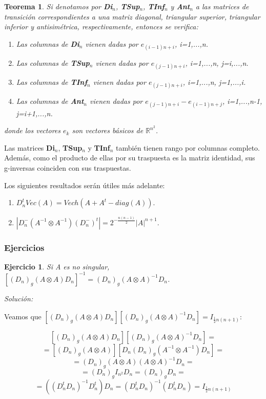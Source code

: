 \documentclass{article}
\theoremstyle{theorem-style}  %
\newtheorem{theorem}{Teorema}[section]  %
\theoremstyle{definition-style}
\theoremstyle{example-style}
\theoremstyle{exercise-style}
\newtheorem{exercise}{Ejercicio}[section]
\begin{document}
	\begin{theorem}
		Si denotamos por \textbf{Di$_n$}, \textbf{TSup$_n$}, \textbf{TInf$_n$} y \textbf{Ant$_n$} a las matrices de transición correspondientes a una matriz diagonal, triangular superior, triangular inferior y antisimétrica, respectivamente, entonces se verifica:
		\begin{enumerate}
			\item Las columnas de \textbf{Di$_n$} vienen dadas por $e_{(i-1)n+i}$, i=1,...,n.
			\item Las columnas de \textbf{TSup$_n$} vienen dadas por $e_{(j-1)n+i}$, i=1,...,n, j=i,...,n.
			\item Las columnas de \textbf{TInf$_n$} vienen dadas por $e_{(j-1)n+i}$, i=1,...,n, j=1,...,i.
			\item Las columnas de \textbf{Ant$_n$} vienen dadas por $e_{(j-1)n+i}-e_{(i-1)n+j}$, i=1,...,n-1, j=i+1,...,n.
		\end{enumerate}
		donde los vectores $e_k$ son vectores básicos de $\mathbb{R}^{n^2}$.
	\end{theorem}
	
	Las matrices \textbf{Di$_n$}, \textbf{TSup$_n$} y \textbf{TInf$_n$} también tienen rango por columnas completo. Además, como el producto de ellas por su traspuesta es la matriz identidad, sus g-inversas coinciden con sus traspuestas.
	
	Los siguientes resultados serán útiles más adelante:
	\begin{enumerate}
		\item $D_n^tVec(A) = Vech(A+A^t-diag(A))$.
		\item $|D_n^-(A^{-1}\otimes A^{-1})(D_n^-)^t| = 2^{-\frac{n(n-1)}{2}}|A|^{n+1}$.
	\end{enumerate}
	
	
	
	\subsubsection{Ejercicios}
	\begin{exercise}
		Si A es no singular, $[(D_n)_g(A\otimes A)D_n]^{-1} = (D_n)_g(A\otimes A)^{-1}D_n$.
	\end{exercise}
	
	\textit{Solución:}
	
	Veamos que $[(D_n)_g(A\otimes A)D_n][(D_n)_g(A\otimes A)^{-1}D_n] = I_{\frac{1}{2}n(n+1)}$:
	
	$$ [(D_n)_g(A\otimes A)D_n][(D_n)_g(A\otimes A)^{-1}D_n] = $$
	$$ = [(D_n)_g(A\otimes A)][D_n(D_n)_g(A^{-1}\otimes A^{-1})D_n] = $$
	$$ = (D_n)_g(A\otimes A)(A \otimes A)^{-1}D_n = $$
	$$ = (D_n)_g I_{n^2}D_n = (D_n)_g D_n = $$
	$$ = ((D_n^tD_n)^{-1}D_n^t )D_n =(D_n^tD_n)^{-1}(D_n^t D_n) = I_{\frac{1}{2}n(n+1)}$$ 
	
\end{document}
